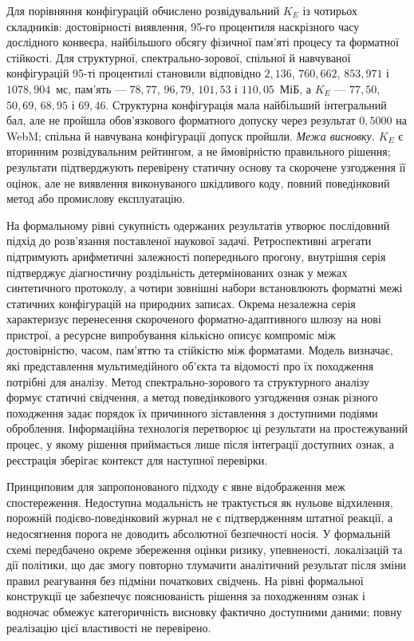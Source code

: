 \begin{enumerate}[label=\arabic*.]
Для порівняння конфігурацій обчислено розвідувальний $K_E$ із чотирьох складників: достовірності виявлення, 95-го процентиля наскрізного часу дослідного конвеєра, найбільшого обсягу фізичної пам’яті процесу та форматної стійкості. Для структурної, спектрально-зорової, спільної й навчуваної конфігурацій 95-ті процентилі становили відповідно $2{,}136$, $760{,}662$, $853{,}971$ і $1078{,}904$~мс, пам’ять --- $78{,}77$, $96{,}79$, $101{,}53$ і $110{,}05$~МіБ, а $K_E$ --- $77{,}50$, $50{,}69$, $68{,}95$ і $69{,}46$. Структурна конфігурація мала найбільший інтегральний бал, але не пройшла обов’язкового форматного допуску через результат $0{,}5000$ на WebM; спільна й навчувана конфігурації допуск пройшли. \textit{Межа висновку.} $K_E$ є вторинним розвідувальним рейтингом, а не ймовірністю правильного рішення; результати підтверджують перевірену статичну основу та скорочене узгодження її оцінок, але не виявлення виконуваного шкідливого коду, повний поведінковий метод або промислову експлуатацію.
\end{enumerate}

На формальному рівні сукупність одержаних результатів утворює послідовний підхід до розв’язання поставленої наукової задачі. Ретроспективні агрегати підтримують арифметичні залежності попереднього прогону, внутрішня серія підтверджує діагностичну роздільність детермінованих ознак у межах синтетичного протоколу, а чотири зовнішні набори встановлюють форматні межі статичних конфігурацій на природних записах. Окрема незалежна серія характеризує перенесення скороченого форматно-адаптивного шлюзу на нові пристрої, а ресурсне випробування кількісно описує компроміс між достовірністю, часом, пам’яттю та стійкістю між форматами. Модель визначає, які представлення мультимедійного об’єкта та відомості про їх походження потрібні для аналізу. Метод спектрально-зорового та структурного аналізу формує статичні свідчення, а метод поведінкового узгодження ознак різного походження задає порядок їх причинного зіставлення з доступними подіями оброблення. Інформаційна технологія перетворює ці результати на простежуваний процес, у якому рішення приймається лише після інтеграції доступних ознак, а реєстрація зберігає контекст для наступної перевірки.

Принциповим для запропонованого підходу є явне відображення меж спостереження. Недоступна модальність не трактується як нульове відхилення, порожній подієво-поведінковий журнал не є підтвердженням штатної реакції, а недосягнення порога не доводить абсолютної безпечності носія. У формальній схемі передбачено окреме збереження оцінки ризику, упевненості, локалізацій та дії політики, що дає змогу повторно тлумачити аналітичний результат після зміни правил реагування без підміни початкових свідчень. На рівні формальної конструкції це забезпечує пояснюваність рішення за походженням ознак і водночас обмежує категоричність висновку фактично доступними даними; повну реалізацію цієї властивості не перевірено.


